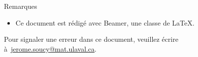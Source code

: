 \documentclass[nuit,charter,pied]{BeamerJS}
\begin{document}

\begin{frame}{Remarques}

 \begin{rems}
 	\begin{itemize}
 		\item Ce document est rédigé avec Beamer, une classe de \LaTeX.
 	\end{itemize}
 \end{rems}

 	\vfill
 	\footnotesize Pour signaler une erreur dans ce document, veuillez écrire à~\href{mailto:jerome.soucy@mat.ulaval.ca}{jerome.soucy@mat.ulaval.ca}.
 \end{frame}
\end{document}
